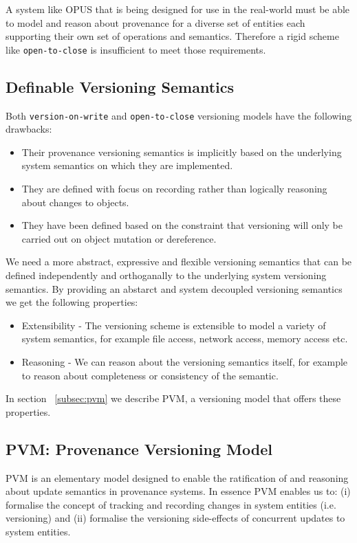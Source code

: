 \documentclass[withindex,glossary]{cam-thesis}
\begin{document}
A system like OPUS that is being designed for use in the real-world must be able to model and reason about provenance for a diverse set of entities each supporting their own set of operations and semantics. Therefore a rigid scheme like \texttt{open-to-close} is insufficient to meet those requirements.

\subsection{Definable Versioning Semantics}
Both \texttt{version-on-write} and \texttt{open-to-close} versioning models have the following drawbacks:
\begin{itemize}
\item Their provenance versioning semantics is implicitly based on the underlying system semantics on which they are implemented.
\item They are defined with focus on recording rather than logically reasoning about changes to objects.
\item They have been defined based on the constraint that versioning will only be carried out on object mutation or dereference.
\end{itemize}

We need a more abstract, expressive and flexible versioning semantics that can be defined independently and orthoganally to the underlying system versioning semantics.
By providing an abstarct and system decoupled versioning semantics we get the following properties:
\begin{itemize}
\item Extensibility - The versioning scheme is extensible to model a variety of system semantics, for example file access, network access, memory access etc.
\item Reasoning - We can reason about the versioning semantics itself, for example to reason about completeness or consistency of the semantic.
\end{itemize}

In section ~\ref{subsec:pvm} we describe PVM, a versioning model that offers these properties.

\subsection{PVM: Provenance Versioning Model}
PVM is an elementary model designed to enable the ratification of and reasoning about update semantics in provenance systems.
In essence PVM enables us to:
(i) formalise the concept of tracking and recording changes in system entities (i.e. versioning) and
(ii) formalise the versioning side-effects of concurrent updates to system entities.
\end{document}
